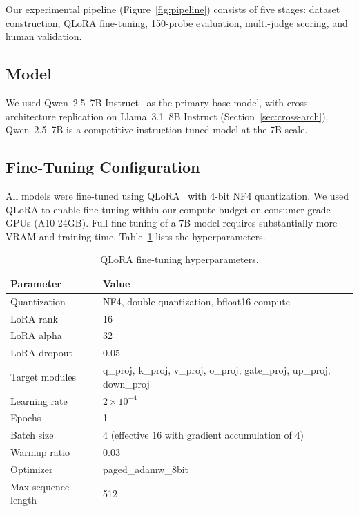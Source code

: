 \documentclass{article}
\begin{document}
Our experimental pipeline (Figure~\ref{fig:pipeline}) consists of five stages:
dataset construction, QLoRA fine-tuning, 150-probe evaluation, multi-judge
scoring, and human validation.



\subsection{Model}

We used Qwen~2.5~7B Instruct~\citep{qwen2024} as the primary base model,
with cross-architecture replication on Llama~3.1~8B Instruct
(Section~\ref{sec:cross-arch}). Qwen~2.5~7B is a competitive
instruction-tuned model at the 7B scale.

\subsection{Fine-Tuning Configuration}

All models were fine-tuned using QLoRA~\citep{dettmers2023qlora} with 4-bit
NF4 quantization. We used QLoRA to enable fine-tuning within our compute
budget on consumer-grade GPUs (A10 24GB). Full fine-tuning of a 7B model
requires substantially more VRAM and training time.
Table~\ref{tab:hyperparams} lists the hyperparameters.

\begin{table}[h]
\centering
\caption{QLoRA fine-tuning hyperparameters.}
\label{tab:hyperparams}
\small
\begin{tabular}{ll}
\toprule
\textbf{Parameter} & \textbf{Value} \\
\midrule
Quantization & NF4, double quantization, bfloat16 compute \\
LoRA rank & 16 \\
LoRA alpha & 32 \\
LoRA dropout & 0.05 \\
Target modules & q\_proj, k\_proj, v\_proj, o\_proj, gate\_proj, up\_proj, down\_proj \\
Learning rate & $2 \times 10^{-4}$ \\
Epochs & 1 \\
Batch size & 4 (effective 16 with gradient accumulation of 4) \\
Warmup ratio & 0.03 \\
Optimizer & paged\_adamw\_8bit \\
Max sequence length & 512 \\
\bottomrule
\end{tabular}
\end{table}
\end{document}
